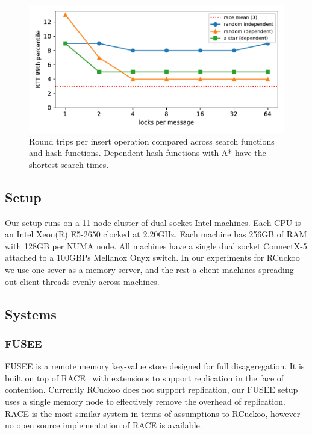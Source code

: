 \begin{figure}[ht]
    \includegraphics[width=0.99\linewidth]{fig/search_dependence.pdf}

    \caption{Round trips per insert operation compared
    across search functions and hash functions. Dependent
    hash functions with A* have the shortest search
    times.~}

    \label{fig:search_dependence}
\end{figure}

\subsection{Setup}

Our setup runs on a 11 node cluster of dual socket Intel
machines. Each CPU is an Intel Xeon(R) E5-2650 clocked at
2.20GHz. Each machine has 256GB of RAM with 128GB per NUMA
node. All machines have a single dual socket ConnectX-5
attached to a 100GBPs Mellanox Onyx switch. In our
experiments for RCuckoo we use one sever as a memory server,
and the rest a client machines spreading out client threads
evenly across machines.

\subsection{Systems}

\subsubsection{FUSEE}

FUSEE is a remote memory key-value store designed for full
disaggregation.  It is built on top of RACE~\cite{race} with
extensions to support replication in the face of contention.
Currently RCuckoo does not support replication, our FUSEE
setup uses a single memory node to effectively remove the
overhead of replication. RACE is the most similar system in
terms of assumptions to RCuckoo, however no open source
implementation of RACE is available.

